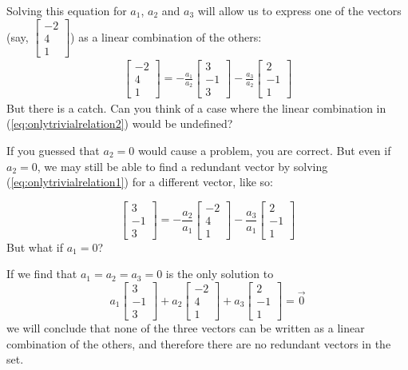 \documentclass{ximera}
\begin{document}
\begin{initprob}
Solving this equation for $a_1$, $a_2$ and $a_3$ will allow us to express one of the vectors (say, $\begin{bmatrix}-2\\4\\1\end{bmatrix}$) as a linear combination of the others:
\begin{align}\label{eq:onlytrivialrelation2}\begin{bmatrix}-2\\4\\1\end{bmatrix}=-\frac{a_1}{a_2}\begin{bmatrix}3\\-1\\3\end{bmatrix}-\frac{a_3}{a_2}\begin{bmatrix}2\\-1\\1\end{bmatrix}\end{align}
But there is a catch.  Can you think of a case where the linear combination in (\ref{eq:onlytrivialrelation2}) would be undefined?

If you guessed that $a_2=0$ would cause a problem, you are correct.  But even if $a_2=0$, we may still be able to find a redundant vector by solving (\ref{eq:onlytrivialrelation1}) for a different vector, like so:

$$\begin{bmatrix}3\\-1\\3\end{bmatrix}=-\frac{a_2}{a_1}\begin{bmatrix}-2\\4\\1\end{bmatrix}-\frac{a_3}{a_1}\begin{bmatrix}2\\-1\\1\end{bmatrix}$$
But what if $a_1=0$?

If we find that $a_1=a_2=a_3=0$ is the only solution to
$$a_1\begin{bmatrix}3\\-1\\3\end{bmatrix}+a_2 \begin{bmatrix}-2\\4\\1\end{bmatrix}+a_3\begin{bmatrix}2\\-1\\1\end{bmatrix}=\vec{0}$$ 
we will conclude that none of the three vectors can be written as a linear combination of the others, and therefore there are no redundant vectors in the set.


\end{initprob}
\end{document}
